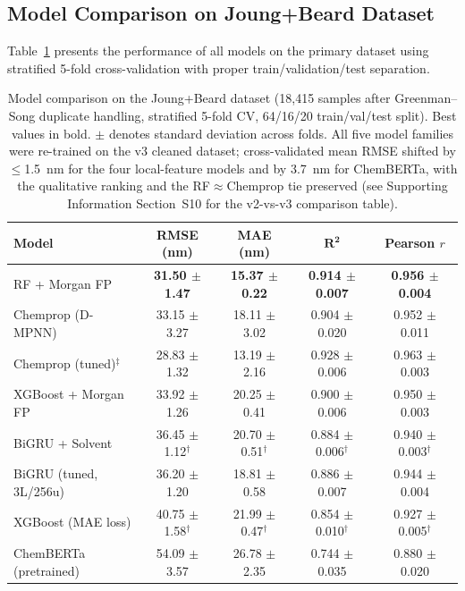 \documentclass[journal=jcisd8,manuscript=article]{achemso}
\begin{document}
\subsection{Model Comparison on Joung+Beard Dataset}
\label{sec:model_comparison}

Table~\ref{tab:model_comparison} presents the performance of all models on the primary dataset using stratified 5-fold cross-validation with proper train/validation/test separation.

\begin{table}[htbp]
\centering
\caption{Model comparison on the Joung+Beard dataset (18,415 samples after Greenman--Song duplicate handling, stratified 5-fold CV, 64/16/20 train/val/test split). Best values in bold. $\pm$ denotes standard deviation across folds. All five model families were re-trained on the v3 cleaned dataset; cross-validated mean RMSE shifted by $\leq$1.5~nm for the four local-feature models and by 3.7~nm for ChemBERTa, with the qualitative ranking and the RF$\approx$Chemprop tie preserved (see Supporting Information Section~S10 for the v2-vs-v3 comparison table).}
\label{tab:model_comparison}
\small
\setlength{\tabcolsep}{4pt}
\begin{tabular}{lcccc}
\toprule
\textbf{Model} & \textbf{RMSE (nm)} & \textbf{MAE (nm)} & $\boldsymbol{R^2}$ & \textbf{Pearson $r$} \\
\midrule
RF + Morgan FP & \textbf{31.50 $\pm$ 1.47} & \textbf{15.37 $\pm$ 0.22} & \textbf{0.914 $\pm$ 0.007} & \textbf{0.956 $\pm$ 0.004} \\
Chemprop (D-MPNN) & 33.15 $\pm$ 3.27 & 18.11 $\pm$ 3.02 & 0.904 $\pm$ 0.020 & 0.952 $\pm$ 0.011 \\
Chemprop (tuned)$^{\ddagger}$ & 28.83 $\pm$ 1.32 & 13.19 $\pm$ 2.16 & 0.928 $\pm$ 0.006 & 0.963 $\pm$ 0.003 \\
XGBoost + Morgan FP & 33.92 $\pm$ 1.26 & 20.25 $\pm$ 0.41 & 0.900 $\pm$ 0.006 & 0.950 $\pm$ 0.003 \\
BiGRU + Solvent & 36.45 $\pm$ 1.12$^{\dagger}$ & 20.70 $\pm$ 0.51$^{\dagger}$ & 0.884 $\pm$ 0.006$^{\dagger}$ & 0.940 $\pm$ 0.003$^{\dagger}$ \\
BiGRU (tuned, 3L/256u)& 36.20 $\pm$ 1.20 & 18.81 $\pm$ 0.58 & 0.886 $\pm$ 0.007 & 0.944 $\pm$ 0.004 \\
XGBoost (MAE loss) & 40.75 $\pm$ 1.58$^{\dagger}$ & 21.99 $\pm$ 0.47$^{\dagger}$ & 0.854 $\pm$ 0.010$^{\dagger}$ & 0.927 $\pm$ 0.005$^{\dagger}$ \\
ChemBERTa (pretrained)& 54.09 $\pm$ 3.57 & 26.78 $\pm$ 2.35 & 0.744 $\pm$ 0.035 & 0.880 $\pm$ 0.020 \\

\end{tabular}
\end{table}
\end{document}
